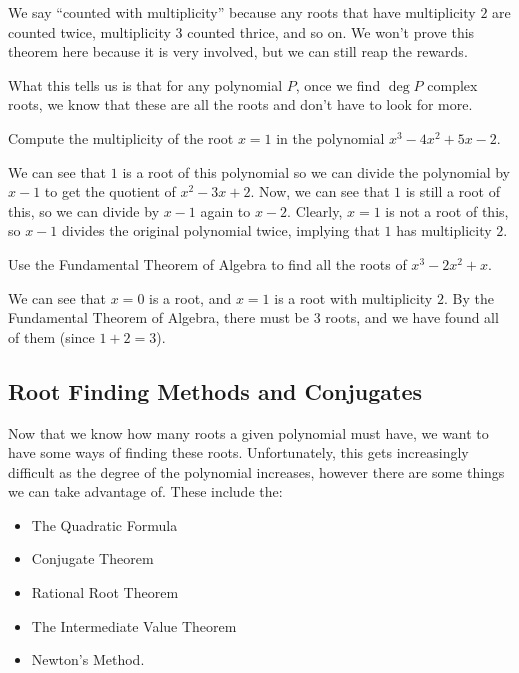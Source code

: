 \documentclass[11pt]{scrartcl}
\begin{document}
We say ``counted with multiplicity'' because any roots that have multiplicity $2$ are counted twice, multiplicity $3$ counted thrice, and so on. We won't prove this theorem here because it is very involved, but we can still reap the rewards.

What this tells us is that for any polynomial $P$, once we find $\deg P$ complex roots, we know that these are all the roots and don't have to look for more.

\begin{example*}
Compute the multiplicity of the root $x = 1$ in the polynomial $x^3-4x^2+5x-2$.
\end{example*}

We can see that $1$ is a root of this polynomial so we can divide the polynomial by $x-1$ to get the quotient of $x^2-3x+2$. Now, we can see that $1$ is still a root of this, so we can divide by $x-1$ again to $x-2$. Clearly, $x = 1$ is not a root of this, so $x-1$ divides the original polynomial twice, implying that $1$ has multiplicity $2$.

\begin{example*}
Use the Fundamental Theorem of Algebra to find all the roots of $x^3-2x^2+x$.
\end{example*}

We can see that $x = 0$ is a root, and $x = 1$ is a root with multiplicity $2$. By the Fundamental Theorem of Algebra, there must be $3$ roots, and we have found all of them (since $1+2 = 3$).

\subsection{Root Finding Methods and Conjugates}

Now that we know how many roots a given polynomial must have, we want to have some ways of finding these roots. Unfortunately, this gets increasingly difficult as the degree of the polynomial increases, however there are some things we can take advantage of. These include the:

\begin{itemize}
\item The Quadratic Formula
\item Conjugate Theorem
\item Rational Root Theorem
\item The Intermediate Value Theorem
\item Newton's Method.
\end{itemize}
\end{document}
